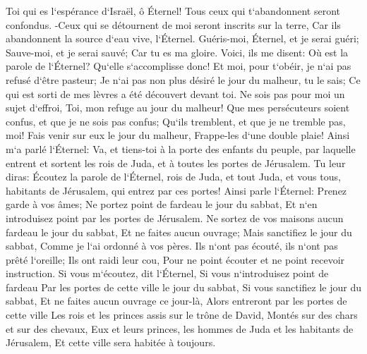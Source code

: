 \verse Toi qui es l`espérance d`Israël, ô Éternel! Tous ceux qui t`abandonnent seront confondus. -Ceux qui se détournent de moi seront inscrits sur la terre, Car ils abandonnent la source d`eau vive, l`Éternel. 
\verse Guéris-moi, Éternel, et je serai guéri; Sauve-moi, et je serai sauvé; Car tu es ma gloire. 
\verse Voici, ils me disent: Où est la parole de l`Éternel? Qu`elle s`accomplisse donc! 
\verse Et moi, pour t`obéir, je n`ai pas refusé d`être pasteur; Je n`ai pas non plus désiré le jour du malheur, tu le sais; Ce qui est sorti de mes lèvres a été découvert devant toi. 
\verse Ne sois pas pour moi un sujet d`effroi, Toi, mon refuge au jour du malheur! 
\verse Que mes persécuteurs soient confus, et que je ne sois pas confus; Qu`ils tremblent, et que je ne tremble pas, moi! Fais venir sur eux le jour du malheur, Frappe-les d`une double plaie! 
\verse Ainsi m`a parlé l`Éternel: Va, et tiens-toi à la porte des enfants du peuple, par laquelle entrent et sortent les rois de Juda, et à toutes les portes de Jérusalem. 
\verse Tu leur diras: Écoutez la parole de l`Éternel, rois de Juda, et tout Juda, et vous tous, habitants de Jérusalem, qui entrez par ces portes! 
\verse Ainsi parle l`Éternel: Prenez garde à vos âmes; Ne portez point de fardeau le jour du sabbat, Et n`en introduisez point par les portes de Jérusalem. 
\verse Ne sortez de vos maisons aucun fardeau le jour du sabbat, Et ne faites aucun ouvrage; Mais sanctifiez le jour du sabbat, Comme je l`ai ordonné à vos pères. 
\verse Ils n`ont pas écouté, ils n`ont pas prêté l`oreille; Ils ont raidi leur cou, Pour ne point écouter et ne point recevoir instruction. 
\verse Si vous m`écoutez, dit l`Éternel, Si vous n`introduisez point de fardeau Par les portes de cette ville le jour du sabbat, Si vous sanctifiez le jour du sabbat, Et ne faites aucun ouvrage ce jour-là, 
\verse Alors entreront par les portes de cette ville Les rois et les princes assis sur le trône de David, Montés sur des chars et sur des chevaux, Eux et leurs princes, les hommes de Juda et les habitants de Jérusalem, Et cette ville sera habitée à toujours. 
